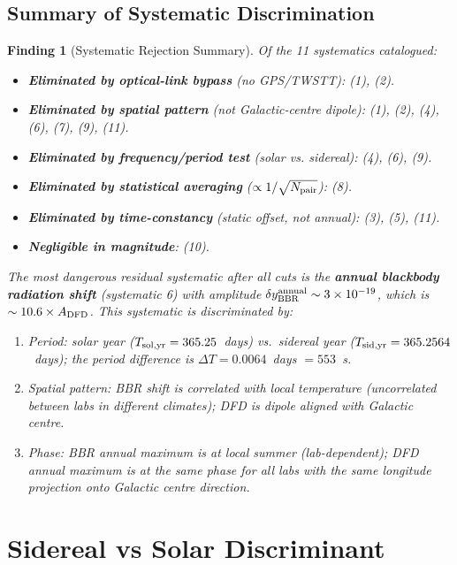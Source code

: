 \documentclass[aps,prd,twocolumn,superscriptaddress,nofootinbib]{revtex4-2}
\newtheorem{finding}{Finding}
\begin{document}
\subsection{Summary of Systematic Discrimination}

\begin{finding}[Systematic Rejection Summary]
\label{find:syst_summary}
Of the 11 systematics catalogued:
\begin{itemize}
\item \textbf{Eliminated by optical-link bypass} (no GPS/TWSTT): (1), (2).
\item \textbf{Eliminated by spatial pattern} (not Galactic-centre dipole): (1), (2), (4), (6), (7), (9), (11).
\item \textbf{Eliminated by frequency/period test} (solar vs. sidereal): (4), (6), (9).
\item \textbf{Eliminated by statistical averaging} ($\propto 1/\sqrt{N_{\rm pair}}$): (8).
\item \textbf{Eliminated by time-constancy} (static offset, not annual): (3), (5), (11).
\item \textbf{Negligible in magnitude}: (10).
\end{itemize}

The most dangerous residual systematic after all cuts is the \textbf{annual
blackbody radiation shift} (systematic 6) with amplitude
$\delta y_{\rm BBR}^{\rm annual} \sim 3\times10^{-19}$, which is
$\sim 10.6\times A_{\rm DFD}$. This systematic is discriminated by:
\begin{enumerate}
\item Period: solar year ($T_{\rm sol,yr} = 365.25$~days) vs.\ sidereal year
      ($T_{\rm sid,yr} = 365.2564$~days); the period difference is
      $\Delta T = 0.0064$~days $= 553$~s.
\item Spatial pattern: BBR shift is correlated with local temperature
      (uncorrelated between labs in different climates); DFD is dipole
      aligned with Galactic centre.
\item Phase: BBR annual maximum is at local summer (lab-dependent);
      DFD annual maximum is at the same phase for all labs with the
      same longitude projection onto Galactic centre direction.
\end{enumerate}
\end{finding}

\section{Sidereal vs Solar Discriminant}
\label{sec:sidereal}
\end{document}
